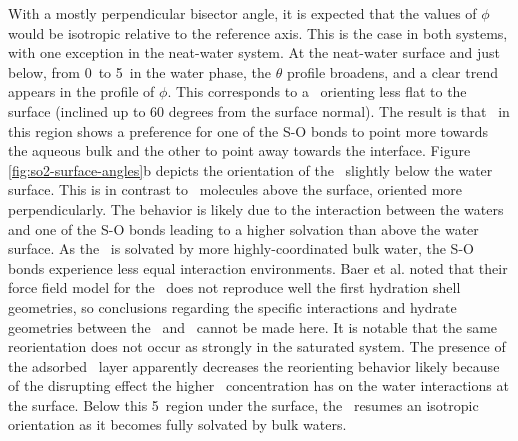   With a mostly perpendicular bisector angle, it is expected that the values of $\phi$ would be isotropic relative to the reference axis. This is the case in both systems, with one exception in the neat-water system. At the neat-water surface and just below, from 0\angs~to 5\angs~in the water phase, the $\theta$ profile broadens, and a clear trend appears in the profile of $\phi$. This corresponds to a \suldiox~orienting less flat to the surface (inclined up to 60 degrees from the surface normal). The result is that \suldiox~in this region shows a preference for one of the S-O bonds to point more towards the aqueous bulk and the other to point away towards the interface. Figure \ref{fig:so2-surface-angles}b depicts the orientation of the \suldiox~slightly below the water surface. This is in contrast to \suldiox~molecules above the surface, oriented more perpendicularly. The behavior is likely due to the interaction between the waters and one of the S-O bonds leading to a higher solvation than above the water surface. As the \suldiox~is solvated by more highly-coordinated bulk water, the S-O bonds experience less equal interaction environments. Baer et al. noted that their force field model for the \suldiox~does not reproduce well the first hydration shell geometries,\cite{Baer2010} so conclusions regarding the specific interactions and hydrate geometries between the \suldiox~and \wat~cannot be made here. It is notable that the same reorientation does not occur as strongly in the saturated system. The presence of the adsorbed \suldiox~layer apparently decreases the reorienting behavior likely because of the disrupting effect the higher \suldiox~concentration has on the water interactions at the surface. Below this 5\angs~region under the surface, the \suldiox~resumes an isotropic orientation as it becomes fully solvated by bulk waters.


